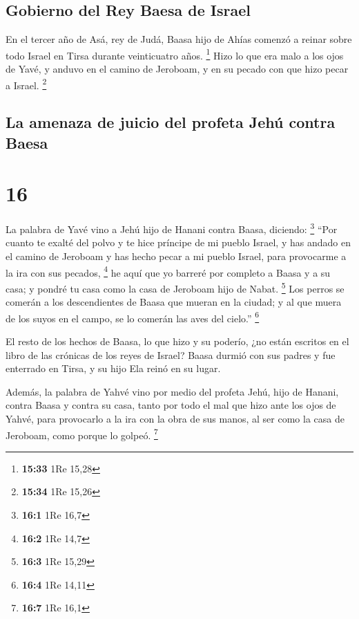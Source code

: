 \hypertarget{gobierno-del-rey-baesa-de-israel}{%
\subsection{Gobierno del Rey Baesa de
Israel}\label{gobierno-del-rey-baesa-de-israel}}

 En el tercer año de Asá, rey de Judá, Baasa hijo de
Ahías comenzó a reinar sobre todo Israel en Tirsa durante veinticuatro
años. \footnote{\textbf{15:33} 1Re 15,28}  Hizo lo que
era malo a los ojos de Yavé, y anduvo en el camino de Jeroboam, y en su
pecado con que hizo pecar a Israel. \footnote{\textbf{15:34} 1Re 15,26}

\hypertarget{la-amenaza-de-juicio-del-profeta-jehuxfa-contra-baesa}{%
\subsection{La amenaza de juicio del profeta Jehú contra
Baesa}\label{la-amenaza-de-juicio-del-profeta-jehuxfa-contra-baesa}}

\hypertarget{section-15}{%
\section{16}\label{section-15}}

 La palabra de Yavé vino a Jehú hijo de Hanani contra
Baasa, diciendo: \footnote{\textbf{16:1} 1Re 16,7}  ``Por
cuanto te exalté del polvo y te hice príncipe de mi pueblo Israel, y has
andado en el camino de Jeroboam y has hecho pecar a mi pueblo Israel,
para provocarme a la ira con sus pecados, \footnote{\textbf{16:2} 1Re
  14,7}  he aquí que yo barreré por completo a Baasa y a
su casa; y pondré tu casa como la casa de Jeroboam hijo de Nabat.
\footnote{\textbf{16:3} 1Re 15,29}  Los perros se comerán
a los descendientes de Baasa que mueran en la ciudad; y al que muera de
los suyos en el campo, se lo comerán las aves del cielo.'' \footnote{\textbf{16:4}
  1Re 14,11}

 El resto de los hechos de Baasa, lo que hizo y su
poderío, ¿no están escritos en el libro de las crónicas de los reyes de
Israel?  Baasa durmió con sus padres y fue enterrado en
Tirsa, y su hijo Ela reinó en su lugar.

 Además, la palabra de Yahvé vino por medio del profeta
Jehú, hijo de Hanani, contra Baasa y contra su casa, tanto por todo el
mal que hizo ante los ojos de Yahvé, para provocarlo a la ira con la
obra de sus manos, al ser como la casa de Jeroboam, como porque lo
golpeó. \footnote{\textbf{16:7} 1Re 16,1}


